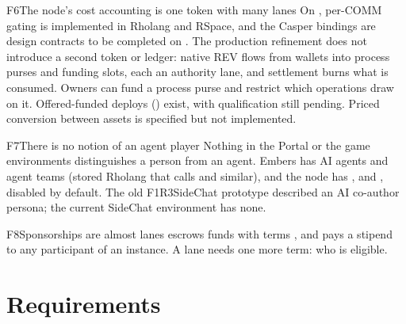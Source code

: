 \documentclass[11pt,a4paper]{article}
\begin{document}
\begin{finding}{F6}{The node's cost accounting is one token with many lanes}
On , per-COMM gating is implemented in Rholang and RSpace, and the
Casper bindings are design contracts to be completed on .
The production refinement does not introduce a second token or ledger: native REV flows from wallets
into process purses and funding slots, each an authority lane, and settlement burns what is
consumed. Owners can fund a process purse and restrict which operations draw on it. Offered-funded
deploys () exist, with qualification still pending. Priced conversion
between assets is specified but not implemented.
\end{finding}

\begin{finding}{F7}{There is no notion of an agent player}
Nothing in the Portal or the game environments distinguishes a person from an agent. Embers has AI
agents and agent teams (stored Rholang that calls  and similar), and the node has
,  and , disabled by default. The old F1R3SideChat
prototype described an AI co-author persona; the current SideChat environment has none.
\end{finding}

\begin{finding}{F8}{Sponsorships are almost lanes}
 escrows funds with terms , and
 pays a stipend to any participant of an instance. A lane needs one more term:
who is eligible.
\end{finding}

\section{Requirements}\label{sec:req}
\end{document}
